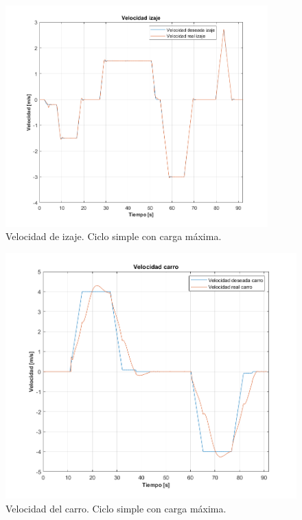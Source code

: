 \documentclass[11pt]{article}
\begin{document}
\begin{figure}%
	\centering
	\includegraphics[width=0.9\textwidth]{images/ciclo_simple_maxima_carga/velocidad_izaje_fix.png}
	\caption{Velocidad de izaje. Ciclo simple con carga máxima.}
	\label{fig:ciclo_simple_maxima_carga_velocidad_izaje}
\end{figure}

\begin{figure}%
	\centering
	\includegraphics[width=1\textwidth]{images/ciclo_simple_maxima_carga/velocidad_carro.png}
	\caption{Velocidad del carro. Ciclo simple con carga máxima.}
	\label{fig:ciclo_simple_maxima_carga_velocidad_carro}
\end{figure}
\end{document}

